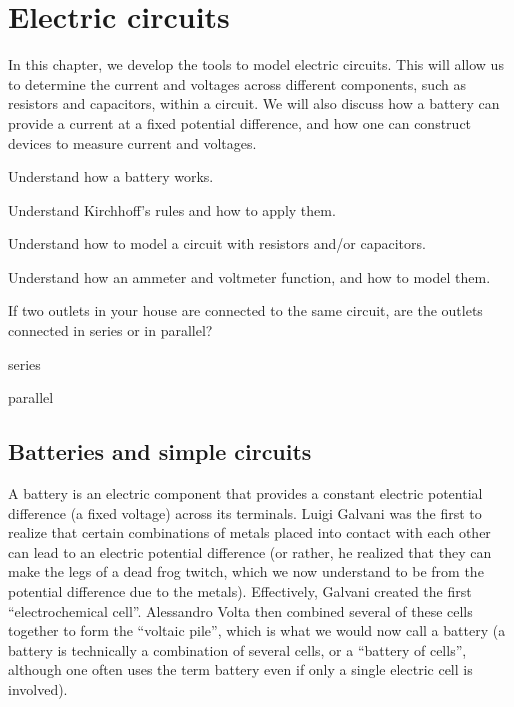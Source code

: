 \chapter{Electric circuits}
\label{chapter:circuits}
In this chapter, we develop the tools to model electric circuits. This will allow us to determine the current and voltages across different components, such as resistors and capacitors, within a circuit. We will also discuss how a battery can provide a current at a fixed potential difference, and how one can construct devices to measure current and voltages.

\begin{learningObjectives}{
 \item Understand how a battery works.
 \item Understand Kirchhoff's rules and how to apply them.
 \item Understand how to model a circuit with resistors and/or capacitors.
 \item Understand how an ammeter and voltmeter function, and how to model them.
 }
\end{learningObjectives}

\begin{opening}
\begin{MCquestion}{If two outlets in your house are connected to the same circuit, are the outlets connected in series or in parallel?}
\item series
\item parallel \correct
\end{MCquestion}
\end{opening}

\section{Batteries and simple circuits}
\label{sec:circuits:batteries}
A battery is an electric component that provides a constant electric potential difference (a fixed voltage) across its terminals. Luigi Galvani was the first to realize that certain combinations of metals placed into contact with each other can lead to an electric potential difference (or rather, he realized that they can make the legs of a dead frog twitch, which we now understand to be from the potential difference due to the metals). Effectively, Galvani created the first ``electrochemical cell''. Alessandro Volta then combined several of these cells together to form the ``voltaic pile'', which is what we would now call a battery (a battery is technically a combination of several cells, or a ``battery of cells'', although one often uses the term battery even if only a single electric cell is involved). 

